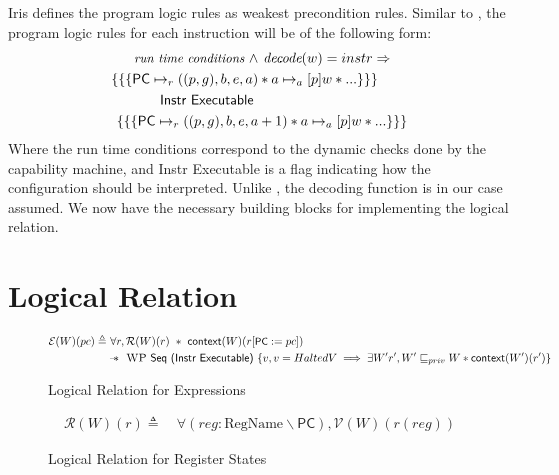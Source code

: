 \documentclass[sigplan,review]{acmart}\settopmatter{printfolios=true,printccs=false,printacmref=false}
\newcommand{\sep}{-\kern-.6em\raisebox{-.659ex}{*}\ }
\newcommand{\interp}[2]{(#1)(#2)}
\begin{document}
Iris defines the program logic rules as weakest precondition rules. Similar to \cite{Jensen:2013}, the program logic rules for each instruction will be of the following form: 
\begin{align*}
\small
	\textit{run time conditions } \wedge &\textit{ decode}(w) = instr \Rightarrow  \\
	\{\{\{ \textsf{PC} \mapsto_r ((p,g),b,e,a) &* a \mapsto_a[p] w * ... \}\}\} \\ 
	\textsf{Instr Executable }\\
	\{\{\{\textsf{PC} \mapsto_r ((p,g),b,e,a&+1) * a \mapsto_a[p] w * ... \}\}\}
\end{align*} 
Where the run time conditions correspond to the dynamic checks done by the capability machine, and \textsf{Instr Executable} is a flag  indicating how the configuration should be interpreted. Unlike \cite{Jensen:2013}, the decoding function is in our case assumed. We now have the necessary building blocks for implementing the logical relation. 

\section{Logical Relation}
\begin{figure*}[ht]
	\begin{minipage}{\textwidth}
	\begin{align*}
		\mathcal{E}\interp{W}{pc} \triangleq&~\forall r, \mathcal{R}(W)(r) ~*~\textsf{context}(W)(r[\textsf{\small PC}:=pc])\\
		&\sep~\textsc{WP}~\textsf{Seq (Instr Executable)}~\{ v, v = HaltedV \implies \exists W' r', W' \sqsubseteq_{priv} W * \textsf{context}(W')(r')\}
	\end{align*}
	\end{minipage}
	\caption{Logical Relation for Expressions}
	\label{fig:expr}
\end{figure*}

\begin{figure*}[ht]
	\begin{minipage}{\textwidth}
	\begin{align*}
		\mathcal{R}\interp{W}{r} \triangleq&~\forall (reg : \text{RegName} \backslash \textsf{PC}), \mathcal{V}\interp{W}{r(reg)}
	\end{align*}
	\end{minipage}
	\caption{Logical Relation for Register States}
	\label{fig:regs}
\end{figure*}
\end{document}
